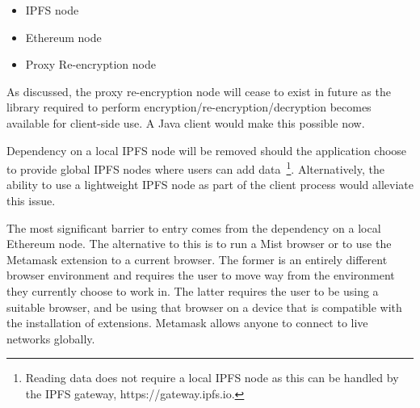 \begin{itemize}
  \item IPFS node
  \item Ethereum node
  \item Proxy Re-encryption node
\end{itemize}

As discussed, the proxy re-encryption node will cease to exist in future as the library required to perform encryption/re-encryption/decryption becomes available for client-side use. A Java client would make this possible now.

Dependency on a local IPFS node will be removed should the application choose to provide global IPFS nodes where users can add data~\footnote{Reading data does not require a local IPFS node as this can be handled by the IPFS gateway, https://gateway.ipfs.io.}. Alternatively, the ability to use a lightweight IPFS node as part of the client process would alleviate this issue.

The most significant barrier to entry comes from the dependency on a local Ethereum node. The alternative to this is to run a Mist browser or to use the Metamask extension to a current browser. The former is an entirely different browser environment and requires the user to move way from the environment they currently choose to work in. The latter requires the user to be using a suitable browser, and be using that browser on a device that is compatible with the installation of extensions. Metamask allows anyone to connect to live networks globally.
